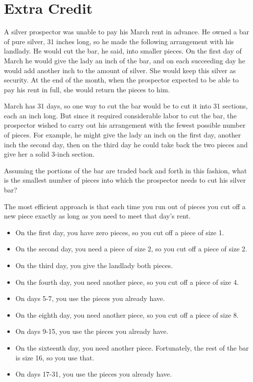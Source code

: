 \documentclass[fleqn,addpoints]{exam}
\begin{document}
\section{Extra Credit}

\begin{questions}

\question
A silver prospector was unable to pay his March rent in advance.  He owned a bar of pure silver, 31 inches long, so he
made the following arrangement with his landlady.  He would cut the bar, he said, into smaller pieces.  On the first day
of March he would give the lady an inch of the bar, and on each succeeding day he would add another inch to the amount
of silver.  She would keep this silver as security.  At the end of the month, when the prospector expected to be able to
pay his rent in full, she would return the pieces to him.

March has 31 days, so one way to cut the bar would be to cut it into 31 sections, each an inch long.  But since it
required considerable labor to cut the bar, the prospector wished to carry out his arrangement with the fewest possible
number of pieces.  For example, he might give the lady an inch on the first day, another inch the second day, then on
the third day he could take back the two pieces and give her a solid 3-inch section.

Assuming the portions of the bar are traded back and forth in this fashion, what is the smallest number of pieces into
which the prospector needs to cut his silver bar?

\begin{solution}

The most efficient approach is that each time you run out of pieces you cut off a new piece exactly as long as you need
to meet that day's rent.  

\begin{itemize}
  \item On the first day, you have zero pieces, so you cut off a piece of size 1.  
  \item On the second day, you need a piece of size 2, so you cut off a piece of size 2.
  \item On the third day, you give the landlady both pieces.
  \item On the fourth day, you need another piece, so you cut off a piece of size 4.
  \item On days 5-7, you use the pieces you already have.
  \item On the eighth day, you need another piece, so you cut off a piece of size 8.
  \item On days 9-15, you use the pieces you already have.
  \item On the sixteenth day, you need another piece.  Fortunately, the rest of the bar is size 16, so you use that.
  \item On days 17-31, you use the pieces you already have.
\end{itemize}


\end{solution}
\end{questions}
\end{document}
